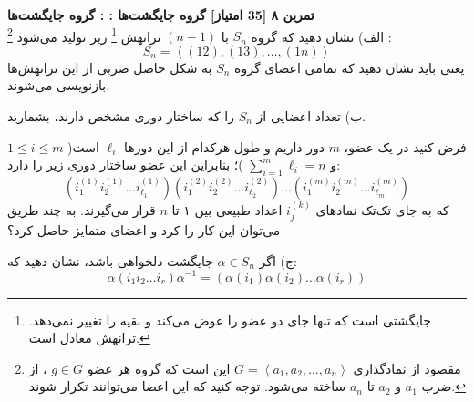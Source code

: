 \documentclass{article}
\newenvironment{exercise}[3][\unskip]{%
	\par
	\noindent
	\textbf{تمرین
		#1
		[#2 امتیاز] 
		\def\temp{#3}\ifx\temp\empty
		: 
		\else
		: #3 \vspace{0.5em} \\ \noindent
		\fi
}}{}
\begin{document}
\begin{exercise}[۸]{35}{گروه جایگشت‌ها
	\LTRfootnote{Symmetric Group}
	}
	الف) نشان دهید که گروه $S_n$ با $(n-1)$ ترانهش
	\footnote{جایگشتی است که تنها جای دو عضو را عوض می‌کند و بقیه را تغییر نمی‌دهد. ترانهش معادل 
	است.
	}
	زیر تولید می‌شود
	\footnote{
	مقصود از نمادگذاری 
	$G = \left <a_1,a_2,\dots,a_n \right >$
	این است که گروه هر عضو
 $g\in G$
 ، از ضرب 
 $a_1$
 و
 $a_2$ 
 تا $a_n$
 ساخته می‌شود. توجه کنید که این اعضا می‌توانند تکرار شوند.
 
	}
	:
	\setlength{\abovedisplayskip}{8pt} \setlength{\belowdisplayskip}{8pt} \setlength{\abovedisplayshortskip}{8pt} \setlength{\belowdisplayshortskip}{8pt}
	\[
	S_n =  \left < (12),(13),\dots,(1n) \right >
	\]
	یعنی باید نشان دهید که تمامی اعضای گروه 
	$S_n$
	به شکل حاصل ضربی از این ترانهش‌ها بازنویسی می‌شوند.
	
	\noindent
	ب) تعداد اعضایی از
	$S_n$ 
	را که ساختار دوری
	مشخص دارند، بشمارید.
	
	
	\noindent
	فرض کنید در یک عضو،
	$m$
	دور داریم و  طول هرکدام از این دورها
	$\ell_i$
است(
$1 \leq i \leq m$
و 
$\sum_{i=1}^m \ell_i = n$
)؛ بنابراین این عضو ساختار دوری زیر را دارد:
\[
(i^{(1)}_1 i^{(1)}_2 \dots i^{(1)}_{\ell_1})(i^{(2)}_1 i^{(2)}_2 \dots i^{(2)}_{\ell_2})
\dots 
(i^{(m)}_1 i^{(m)}_2 \dots i^{(m)}_{\ell_m})
\]
			که به جای تک‌تک نمادهای 
			$i^{(k)}_j$
			اعداد طبیعی بین ۱ تا $n$ قرار می‌گیرند. به چند طریق می‌توان این کار را کرد و اعضای متمایز حاصل کرد؟
		
	\noindent
	ج) اگر 
	$\alpha \in S_n$
	 جایگشت دلخواهی باشد، نشان دهید که:
	 \[
	 \alpha (i_1i_2\dots i_r)\alpha^{-1} = (\alpha(i_1)\alpha(i_2)\dots \alpha(i_r))
	 \]
\end{exercise}
\end{document}
